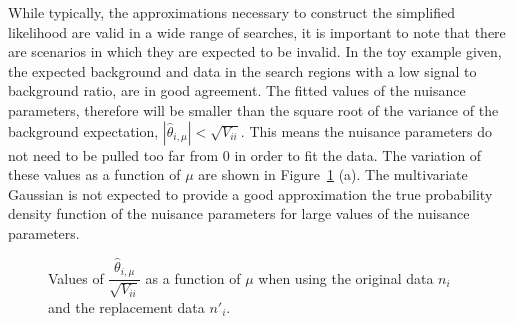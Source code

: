 While typically, the approximations necessary to construct the simplified likelihood are valid in a wide range of searches, 
it is important to note that there are scenarios in which they are expected to be invalid. 
In the toy example given, the expected background and data in the search regions with a low signal to background ratio, are in good agreement. 
The fitted values of the nuisance parameters, therefore will be smaller than the square root of the variance of the 
background expectation,  $|\hat{\theta}_{i,\mu}| \lt \sqrt{V_{ii}}$. This means the nuisance parameters do not need to be pulled too far from 0 in order to  
fit the data. The variation of these values as a function of $\mu$ are shown in Figure~\ref{fig:nuisancevariation} (a). 
The multivariate Gaussian is not expected to provide a good approximation the true probability density function of the nuisance parameters for 
large values of the nuisance parameters.

\begin{figure}[hbt]
  \begin{center} 
   \caption{Values of $\dfrac{\hat{\theta}_{i,\mu}}{\sqrt{V_{ii}}}$ as a function of $\mu$ when using the original data $n_{i}$ and the replacement data $n'_{i}$.}
   \label{fig:nuisancevariation} 
  \end{center}
\end{figure}


